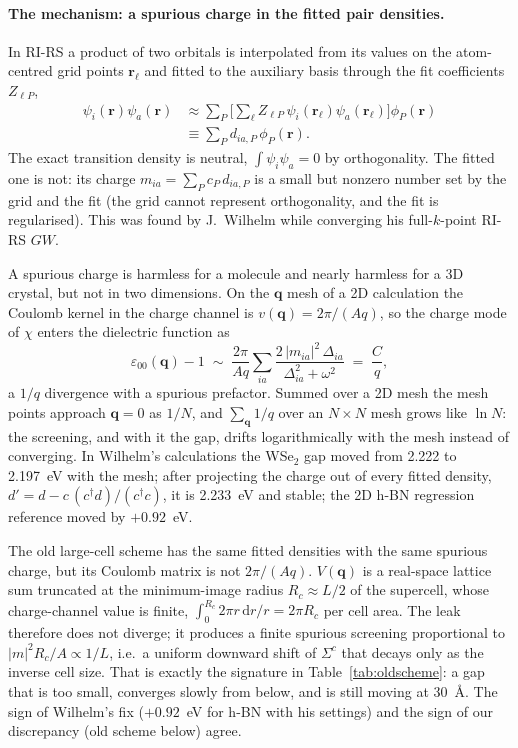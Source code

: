 \documentclass[%
 reprint,
superscriptaddress,
 amsmath,amssymb,
 aps,
prb,
]{revtex4-2}
\newcommand{\br}{\mathbf{r}}
\newcommand{\bq}{\mathbf{q}}
\newcommand{\dd}{\mathrm{d}}
\begin{document}
\paragraph{The mechanism: a spurious charge in the fitted pair densities.}
In RI-RS a product of two orbitals is interpolated from its values on the atom-centred grid
points $\br_\ell$ and fitted to the auxiliary basis through the fit coefficients $Z_{\ell P}$,
\begin{equation}
\begin{aligned}
  \psi_i(\br)\psi_a(\br) &\approx \sum_{P}\Big[\sum_\ell Z_{\ell P}\,\psi_i(\br_\ell)\psi_a(\br_\ell)\Big]\phi_P(\br)\\
  &\equiv \sum_P d_{ia,P}\,\phi_P(\br).
\end{aligned}
\end{equation}
The exact transition density is neutral, $\int\psi_i\psi_a = 0$ by orthogonality. The fitted one
is not: its charge $m_{ia} = \sum_P c_P\,d_{ia,P}$ is a small but nonzero number set by the grid
and the fit (the grid cannot represent orthogonality, and the fit is regularised). This was
found by J.~Wilhelm while converging his full-$k$-point RI-RS $GW$.

A spurious charge is harmless for a molecule and nearly harmless for a 3D crystal, but not in
two dimensions. On the $\bq$ mesh of a 2D calculation the Coulomb kernel in the charge channel
is $v(\bq) = 2\pi/(Aq)$, so the charge mode of $\chi$ enters the dielectric function as
\begin{equation}
  \varepsilon_{00}(\bq) - 1 \;\sim\; \frac{2\pi}{Aq}\sum_{ia}\frac{2\,|m_{ia}|^2\,\Delta_{ia}}{\Delta_{ia}^2+\omega^2}
  \;=\; \frac{C}{q},
\end{equation}
a $1/q$ divergence with a spurious prefactor. Summed over a 2D mesh the mesh points approach
$\bq = 0$ as $1/N$, and $\sum_\bq 1/q$ over an $N\times N$ mesh grows like $\ln N$: the
screening, and with it the gap, drifts logarithmically with the mesh instead of converging. In
Wilhelm's calculations the WSe$_2$ gap moved from 2.222 to 2.197~eV with the mesh; after
projecting the charge out of every fitted density, $d' = d - c\,(c^\dagger d)/(c^\dagger c)$, it
is 2.233~eV and stable; the 2D h-BN regression reference moved by $+0.92$~eV.

The old large-cell scheme has the same fitted densities with the same spurious charge, but its
Coulomb matrix is not $2\pi/(Aq)$. $V(\bq)$ is a real-space lattice sum truncated at the
minimum-image radius $R_c \approx L/2$ of the supercell, whose charge-channel value is finite,
$\int_0^{R_c}\!2\pi r\,\dd r/r = 2\pi R_c$ per cell area. The leak therefore does not
diverge; it produces a finite spurious screening proportional to $|m|^2 R_c/A \propto 1/L$,
i.e.\ a uniform downward shift of $\Sigma^c$ that decays only as the inverse cell size. That is
exactly the signature in Table~\ref{tab:oldscheme}: a gap that is too small, converges slowly
from below, and is still moving at 30~\AA. The sign of Wilhelm's fix ($+0.92$~eV for h-BN with
his settings) and the sign of our discrepancy (old scheme below) agree.
\end{document}
